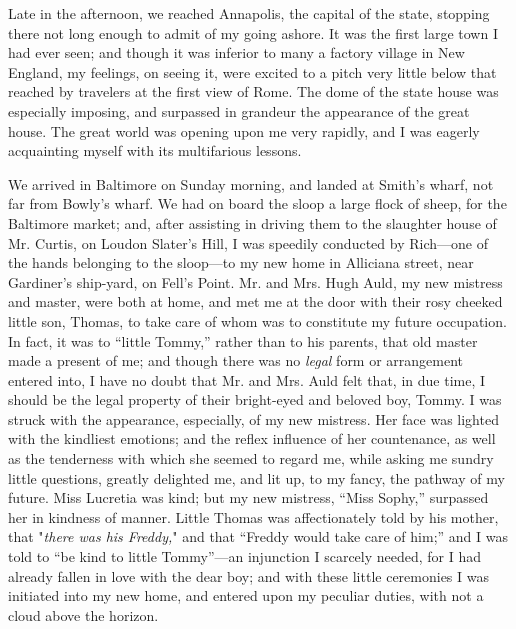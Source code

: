 Late in the afternoon, we reached Annapolis, the capital of the state,
stopping there not long enough to admit of my going ashore. It was the
first large town I had ever seen; and though it was inferior to many a
factory village in New England, my feelings, on seeing it, were excited
to a pitch very little below that reached by travelers at the first view
of Rome. The dome of the state house was especially imposing, and
surpassed in grandeur the appearance of the great house. The great world
was opening upon me very rapidly, and I was eagerly acquainting myself
with its multifarious lessons.

We arrived in Baltimore on Sunday morning, and landed at Smith's wharf,
not far from Bowly's wharf. We had on board the sloop a large flock of
sheep, for the Baltimore market; and, after assisting in driving them to
the slaughter house of Mr. Curtis, on Loudon Slater's Hill, I was
speedily conducted by Rich---one of the hands belonging to the
sloop---to my new home in Alliciana street, near Gardiner's ship-yard,
on Fell's Point. Mr. and Mrs. Hugh Auld, my new mistress and master,
were both at home, and met me at the door with their rosy cheeked little
son, Thomas, to take {\protect\hypertarget{138}{}{}}care of whom was to
constitute my future occupation. In fact, it was to ``little Tommy,''
rather than to his parents, that old master made a present of me; and
though there was no \emph{legal} form or arrangement entered into, I
have no doubt that Mr. and Mrs. Auld felt that, in due time, I should be
the legal property of their bright-eyed and beloved boy, Tommy. I was
struck with the appearance, especially, of my new mistress. Her face was
lighted with the kindliest emotions; and the reflex influence of her
countenance, as well as the tenderness with which she seemed to regard
me, while asking me sundry little questions, greatly delighted me, and
lit up, to my fancy, the pathway of my future. Miss Lucretia was kind;
but my new mistress, ``Miss Sophy,'' surpassed her in kindness of
manner. Little Thomas was affectionately told by his mother, that
"\emph{there was his Freddy,}" and that ``Freddy would take care of
him;'' and I was told to ``be kind to little Tommy''---an injunction I
scarcely needed, for I had already fallen in love with the dear boy; and
with these little ceremonies I was initiated into my new home, and
entered upon my peculiar duties, with not a cloud above the horizon.

